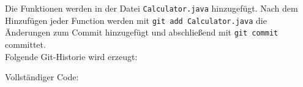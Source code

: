 Die Funktionen werden in der Datei \texttt{Calculator.java} hinzugefügt.
Nach dem Hinzufügen jeder Function werden mit \lstinline|git add Calculator.java| die Änderungen zum Commit hinzugefügt und abschließend mit \lstinline|git commit| committet.\\

Folgende Git-Historie wird erzeugt:


Vollständiger Code:

